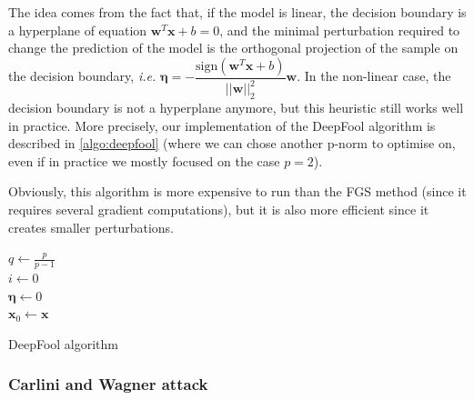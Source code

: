 \documentclass[10pt,twocolumn,letterpaper]{article}
\begin{document}
The idea comes from the fact that, if the model is linear, the decision boundary is a hyperplane of equation $\bm{w}^T\bm{x} + b = 0$, and the minimal perturbation required to change the prediction of the model is the orthogonal projection of the sample on the decision boundary, \textit{i.e.} $\bm{\eta} = - \dfrac{\text{sign}(\bm{w}^T\bm{x} + b)}{||\bm{w}||_2^2} \bm{w}$. In the non-linear case, the decision boundary is not a hyperplane anymore, but this heuristic still works well in practice. More precisely, our implementation of the DeepFool algorithm is described in \ref{algo:deepfool} (where we can chose another p-norm to optimise on, even if in practice we mostly focused on the case $p=2$).

Obviously, this algorithm is more expensive to run than the FGS method (since it requires several gradient computations), but it is also more efficient since it creates smaller perturbations.

\begin{algorithm}
    \SetAlgoLined
        \KwOutput{$\bm{\eta}$}
    $q \leftarrow \frac{p}{p-1}$ \\
    $i \leftarrow 0$ \\
    $\bm{\eta} \leftarrow 0$ \\
    $\bm{x}_0 \leftarrow \bm{x}$ \\
    \caption{DeepFool algorithm}
    \label{algo:deepfool}
\end{algorithm}

\subsubsection{Carlini and Wagner attack}
\end{document}
